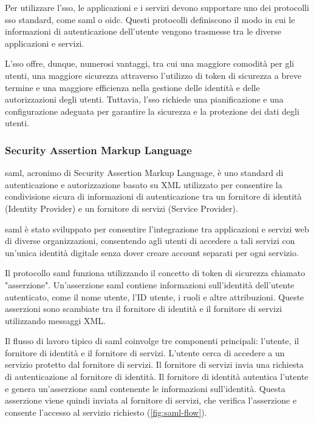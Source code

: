 Per utilizzare l'\acrshort{sso}, le applicazioni e i servizi devono supportare uno dei protocolli \acrshort{sso} standard, come \acrshort{saml} o \acrshort{oidc}. Questi protocolli definiscono il modo in cui le informazioni di autenticazione dell'utente vengono trasmesse tra le diverse applicazioni e servizi.

L'\acrshort{sso} offre, dunque, numerosi vantaggi, tra cui una maggiore comodità per gli utenti, una maggiore sicurezza attraverso l'utilizzo di token di sicurezza a breve termine e una maggiore efficienza nella gestione delle identità e delle autorizzazioni degli utenti. Tuttavia, l'\acrshort{sso} richiede una pianificazione e una configurazione adeguata per garantire la sicurezza e la protezione dei dati degli utenti.

\subsubsection{Security Assertion Markup Language}

\acrshort{saml}\cite{site:saml}, acronimo di Security Assertion Markup Language, è uno standard di autenticazione e autorizzazione basato su XML utilizzato per consentire la condivisione sicura di informazioni di autenticazione tra un fornitore di identità (Identity Provider) e un fornitore di servizi (Service Provider).

\acrshort{saml} è stato sviluppato per consentire l'integrazione tra applicazioni e servizi web di diverse organizzazioni, consentendo agli utenti di accedere a tali servizi con un'unica identità digitale senza dover creare account separati per ogni servizio.

Il protocollo \acrshort{saml} funziona utilizzando il concetto di token di sicurezza chiamato "asserzione". Un'asserzione \acrshort{saml} contiene informazioni sull'identità dell'utente autenticato, come il nome utente, l'ID utente, i ruoli e altre attribuzioni. Queste asserzioni sono scambiate tra il fornitore di identità e il fornitore di servizi utilizzando messaggi XML.

Il flusso di lavoro tipico di \acrshort{saml} coinvolge tre componenti principali: l'utente, il fornitore di identità e il fornitore di servizi. L'utente cerca di accedere a un servizio protetto dal fornitore di servizi. Il fornitore di servizi invia una richiesta di autenticazione al fornitore di identità. Il fornitore di identità autentica l'utente e genera un'asserzione \acrshort{saml} contenente le informazioni sull'identità. Questa asserzione viene quindi inviata al fornitore di servizi, che verifica l'asserzione e consente l'accesso al servizio richiesto (\autoref{fig:saml-flow}).


